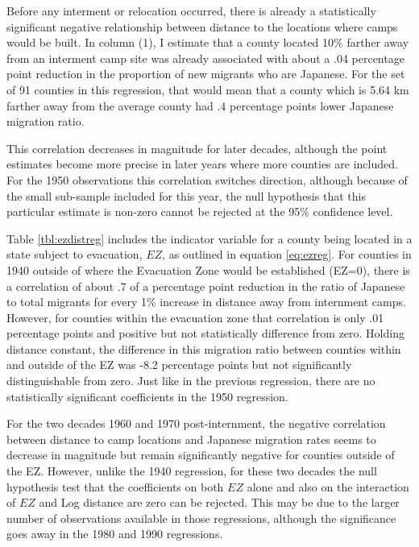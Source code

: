 \documentclass[12pt]{article}
\begin{document}
Before any interment or relocation occurred, there is already a statistically significant negative relationship between distance to the locations where camps would be built.
In column (1), I estimate that a county located 10\% farther away from an interment camp site was already associated with about a .04 percentage point reduction in the proportion of new migrants who are Japanese.
For the set of 91 counties in this regression, that would mean that a county which is 5.64 km farther away from the average county had .4 percentage points lower Japanese migration ratio.

This correlation decreases in magnitude for later decades, although the point estimates become more precise in later years where more counties are included.
For the 1950 observations this correlation switches direction, although because of the small sub-sample included for this year, the null hypothesis that this particular estimate is non-zero cannot be rejected at the 95\% confidence level.


Table \ref{tbl:ezdistreg} includes the indicator variable for a county being located in a state subject to evacuation, $EZ$, as outlined in equation \ref{eq:ezreg}.
For counties in 1940 outside of where the Evacuation Zone would be established (EZ=0), there is a correlation of about .7 of a percentage point reduction in the ratio of Japanese to total migrants for every 1\% increase in distance away from internment camps.
However, for counties within the evacuation zone that correlation is only .01 percentage points and positive but not statistically difference from zero.
Holding distance constant, the difference in this migration ratio between counties within and outside of the EZ was -8.2 percentage points but not significantly distinguishable from zero.
Just like in the previous regression, there are no statistically significant coefficients in the 1950 regression.

For the two decades 1960 and 1970 post-internment, the negative correlation between distance to camp locations and Japanese migration rates seems to decrease in magnitude but remain significantly negative for counties outside of the EZ.
However, unlike the 1940 regression, for these two decades the null hypothesis test that the coefficients on both $EZ$ alone and also on the interaction of $EZ$ and Log distance are zero can be rejected.
This may be due to the larger number of observations available in those regressions, although the significance goes away in the 1980 and 1990 regressions.
\end{document}
